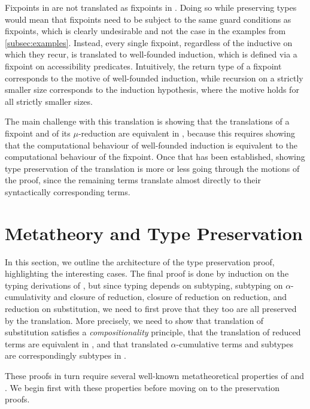 \documentclass[acmsmall,review,anonymous]{acmart}\settopmatter{printfolios=true,printccs=false,printacmref=false}
\begin{document}

Fixpoints in \lang are not translated as fixpoints in \CICE.
Doing so while preserving types would mean that \lang fixpoints
need to be subject to the same guard conditions as \CICE fixpoints,
which is clearly undesirable and not the case in the examples from \cref{subsec:examples}.
Instead, every single \lang fixpoint, regardless of the inductive on which they recur,
is translated to well-founded induction,
which is defined via a \CICE fixpoint on accessibility predicates.
Intuitively, the return type of a fixpoint corresponds to the motive of well-founded induction,
while recursion on a strictly smaller size corresponds to the induction hypothesis,
where the motive holds for all strictly smaller sizes.

The main challenge with this translation is showing that the translations of a fixpoint
and of its $\mu$-reduction are equivalent in \CICE,
because this requires showing that the computational behaviour of well-founded induction
is equivalent to the computational behaviour of the fixpoint.
Once that has been established,
showing type preservation of the translation is more or less going through the motions of the proof,
since the remaining \lang terms translate almost directly to their syntactically corresponding terms.

\section{Metatheory and Type Preservation} \label{sec:proofs}

In this section, we outline the architecture of the type preservation proof,
highlighting the interesting cases.
The final proof is done by induction on the typing derivations of \lang,
but since typing depends on subtyping,
subtyping on $\alpha$-cumulativity and closure of reduction,
closure of reduction on reduction, and reduction on substitution,
we need to first prove that they too are all preserved by the translation.
More precisely, we need to show that translation of substitution satisfies a \emph{compositionality} principle,
that the translation of reduced terms are equivalent in \CICE,
and that translated $\alpha$-cumulative terms and subtypes are correspondingly subtypes in \CICE.

These proofs in turn require several well-known metatheoretical properties of \lang and \CICE.
We begin first with these properties before moving on to the preservation proofs.
\end{document}
